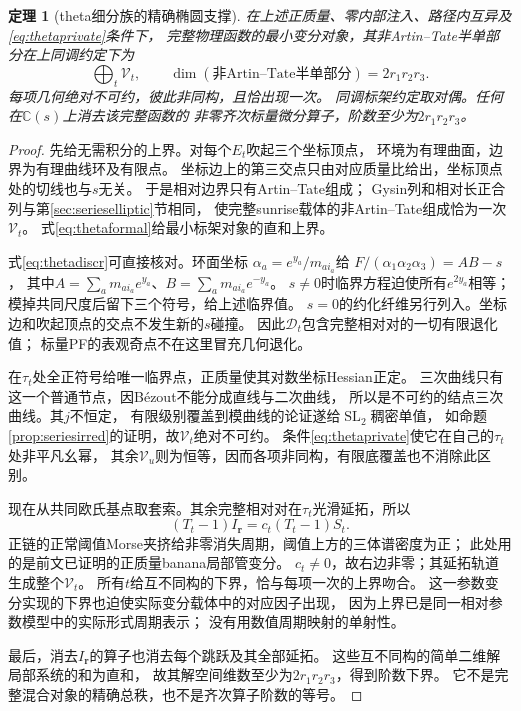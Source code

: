 \documentclass[11pt,a4paper]{ctexart}
\theoremstyle{cnplain}\newtheorem{theorem}{定理}[section]
\theoremstyle{definition}\newtheorem{definition}[theorem]{定义}
\theoremstyle{remark}\newtheorem{remark}[theorem]{注}
\begin{document}
\begin{theorem}[theta细分族的精确椭圆支撑]\label{thm:thetavisible}
在上述正质量、零内部注入、路径内互异及\eqref{eq:thetaprivate}条件下，
完整物理函数的最小变分对象，其非Artin--Tate半单部分在上同调约定下为
\begin{equation}\label{eq:thetass}
       \bigoplus_t\mathcal V_t,\qquad
       \dim(\text{非Artin--Tate半单部分})=2r_1r_2r_3 .
\end{equation}
每项几何绝对不可约，彼此非同构，且恰出现一次。
同调标架约定取对偶。任何在$\mathbb C(s)$上消去该完整函数的
非零齐次标量微分算子，阶数至少为$2r_1r_2r_3$。
\end{theorem}
\begin{proof}
先给无需积分的上界。对每个$E_t$吹起三个坐标顶点，
环境为有理曲面，边界为有理曲线环及有限点。
坐标边上的第三交点只由对应质量比给出，坐标顶点处的切线也与$s$无关。
于是相对边界只有Artin--Tate组成；
Gysin列和相对长正合列与第\ref{sec:serieselliptic}节相同，
使完整sunrise载体的非Artin--Tate组成恰为一次$\mathcal V_t$。
式\eqref{eq:thetaformal}给最小标架对象的直和上界。

式\eqref{eq:thetadiscr}可直接核对。环面坐标
$\alpha_a=e^{y_a}/m_{ai_a}$给
$F/(\alpha_1\alpha_2\alpha_3)=AB-s$，
其中$A=\sum_a m_{ai_a}e^{y_a}$、$B=\sum_a m_{ai_a}e^{-y_a}$。
$s\ne0$时临界方程迫使所有$e^{2y_a}$相等；
模掉共同尺度后留下三个符号，给上述临界值。
$s=0$的约化纤维另行列入。坐标边和吹起顶点的交点不发生新的$s$碰撞。
因此$\mathcal D_t$包含完整相对对的一切有限退化值；
标量PF的表观奇点不在这里冒充几何退化。

在$\tau_t$处全正符号给唯一临界点，正质量使其对数坐标Hessian正定。
三次曲线只有这一个普通节点，因Bézout不能分成直线与二次曲线，
所以是不可约的结点三次曲线。其$j$不恒定，
有限级别覆盖到模曲线的论证遂给$\operatorname{SL}_2$稠密单值，
如命题\ref{prop:seriesirred}的证明，故$\mathcal V_t$绝对不可约。
条件\eqref{eq:thetaprivate}使它在自己的$\tau_t$处非平凡幺幂，
其余$\mathcal V_u$则为恒等，因而各项非同构，有限底覆盖也不消除此区别。

现在从共同欧氏基点取套索。其余完整相对对在$\tau_t$光滑延拓，所以
\[
 (T_t-1)I_{\mathbf r}=c_t(T_t-1)S_t .
\]
正链的正常阈值Morse夹挤给非零消失周期，阈值上方的三体谱密度为正；
此处用的是前文已证明的正质量banana局部管变分。
$c_t\ne0$，故右边非零；其延拓轨道生成整个$\mathcal V_t$。
所有$t$给互不同构的下界，恰与每项一次的上界吻合。
这一参数变分实现的下界也迫使实际变分载体中的对应因子出现，
因为上界已是同一相对参数模型中的实际形式周期表示；
没有用数值周期映射的单射性。

最后，消去$I_{\mathbf r}$的算子也消去每个跳跃及其全部延拓。
这些互不同构的简单二维解局部系统的和为直和，
故其解空间维数至少为$2r_1r_2r_3$，得到阶数下界。
它不是完整混合对象的精确总秩，也不是齐次算子阶数的等号。
\end{proof}
\end{document}
